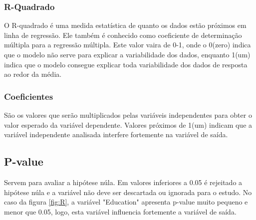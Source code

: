 \subsubsection*{R-Quadrado}

O R-quadrado é uma medida estatística de quanto os dados estão próximos em linha de regressão. Ele também é conhecido como coeficiente de determinação múltipla para a regressão múltipla. Este valor vaira de 0-1, onde o 0(zero) indica que o modelo não serve para explicar a variabilidade dos dados, enquanto 1(um) indica que o modelo consegue explicar toda variabilidade dos dados de resposta ao redor da média\cite{5}. 

\subsubsection*{Coeficientes}

São os valores que serão multiplicados pelas variáveis independentes para obter o valor esperado da variável dependente. Valores próximos de 1(um) indicam que a variável independente analisada interfere fortemente na variável de saída\cite{5}. 

\subsection*{P-value}

Servem para avaliar a hipótese núla. Em valores inferiores a 0.05 é rejeitado a hipótese núla e a variável não deve ser descartada ou ignorada para o estudo. No caso da figura \ref*{fig:R}, a variável "Education" apresenta p-value muito pequeno e menor que 0.05, logo, esta variável influencia fortemente a variável de saída\cite{5}.
